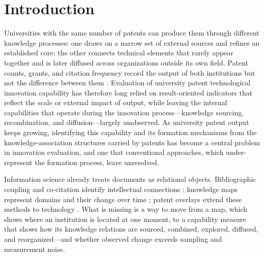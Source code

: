 \section{Introduction}\label{sec:introduction}
Universities with the same number of patents can produce them through
different knowledge processes: one draws on a narrow set of external sources
and refines an established core; the other connects technical elements that
rarely appear together and is later diffused across organizations outside its
own field. Patent counts, grants, and citation frequency record the output of
both institutions but not the difference between them
\citep{griliches1990,hall2005,nagaoka2010}. Evaluation of university patent
technological innovation capability has therefore long relied on
result-oriented indicators that reflect the scale or external impact of
output, while leaving the internal capabilities that operate during the
innovation process---knowledge sourcing, recombination, and
diffusion---largely unobserved. As university patent output keeps growing,
identifying this capability and its formation mechanisms from the
knowledge-association structures carried by patents has become a central
problem in innovation evaluation, and one that conventional approaches, which
under-represent the formation process, leave unresolved.

Information science already treats documents as relational objects.
Bibliographic coupling and co-citation identify intellectual connections
\citep{kessler1963,small1973,price1965}; knowledge maps represent domains and
their change over time \citep{borner2003,chen2006,vaneck2010}; patent overlays
extend these methods to technology
\citep{rafols2010,kay2014,leydesdorff2014,yan2017}. What is missing is a way to
move from a map, which shows where an institution is located at one moment, to a
capability measure that shows how its knowledge relations are sourced,
combined, explored, diffused, and reorganized---and whether observed change
exceeds sampling and measurement noise.

